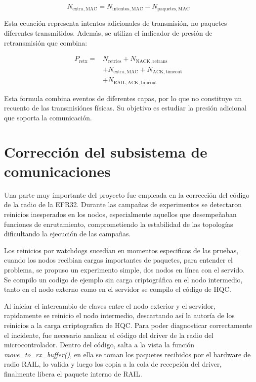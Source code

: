 \[
N_{\mathrm{extra,MAC}}=
N_{\mathrm{intentos,MAC}}-N_{\mathrm{paquetes,MAC}}
\]

Esta ecuación representa intentos adicionales de transmisión, no paquetes diferentes transmitidos. Además, se utiliza el 
indicador de presión de retransmisión que combina:

\[
\begin{aligned}
P_{\mathrm{retx}}={}&N_{\mathrm{retries}}+
N_{\mathrm{NACK,retrans}}\\
&+N_{\mathrm{extra,MAC}}+
N_{\mathrm{ACK,timeout}}\\
&+N_{\mathrm{RAIL,ACK,timeout}}
\end{aligned}
\]

Esta formula combina eventos de diferentes capas, por lo que no constituye un recuento de las transmisiónes físicas. Su objetivo
es estudiar la presión adicional que soporta la comunicación. 

\section{Corrección del subsistema de comunicaciones}
  Una parte muy importante del proyecto fue empleada en la corrección del código de la radio 
  de la EFR32. Durante las campañas de experimentos se detectaron reinicios inesperados en los nodos, 
  especialmente aquellos que desempeñaban funciones de enrutamiento, comprometiendo la estabilidad de las
  topologías dificultando la ejecución de las campañas. 

  Los reinicios por watchdogs sucedían en momentos especificos de las pruebas, cuando los nodos recibian cargas importantes 
  de paquetes, para entender el problema, se propuso un experimento simple, dos nodos en línea con el servido. 
  Se compilo un codigo de ejemplo sin carga criptográfica en el nodo intermedio, tanto en el nodo externo como en 
  el servidor se compilo el código de HQC. 

  Al iniciar el intercambio de claves entre el nodo exterior y el servidor, rapidamente se reinicio el nodo intermedio, 
  descartando así la autoría de los reinicios a la carga crriptografica de HQC. Para poder diagnosticar correctamente el 
  incidente, fue necesario analizar el código del driver de la radio del microcontrolador. Dentro del código, salta a la vista 
  la función \textit{move\_to\_rx\_buffer()}, en ella se toman los paquetes recibidos por el hardware de radio RAIL, lo valida 
  y luego los copia a la cola de recepción del driver, finalmente libera el paquete interno de RAIL. 

